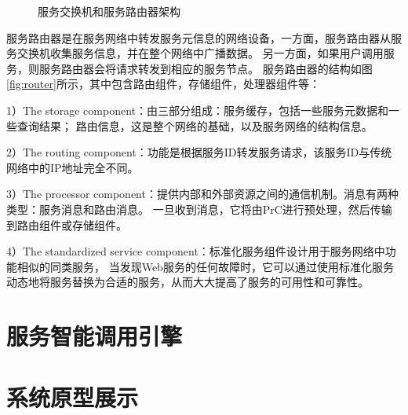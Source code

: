   \begin{figure}[htbp]
    \caption{服务交换机和服务路由器架构}
    \label{fig:loss}
    \end{figure}


    服务路由器是在服务网络中转发服务元信息的网络设备，一方面，服务路由器从服务交换机收集服务信息，并在整个网络中广播数据。 
    另一方面，如果用户调用服务，则服务路由器会将请求转发到相应的服务节点。 
    服务路由器的结构如图\ref{fig:router}所示，其中包含路由组件，存储组件，处理器组件等：

    1）The storage component：由三部分组成：服务缓存，包括一些服务元数据和一些查询结果；
    路由信息，这是整个网络的基础，以及服务网络的结构信息。
    
    2）The routing component：功能是根据服务ID转发服务请求，该服务ID与传统网络中的IP地址完全不同。
    
    3）The processor component：提供内部和外部资源之间的通信机制。消息有两种类型：服务消息和路由消息。
    一旦收到消息，它将由PrC进行预处理，然后传输到路由组件或存储组件。
    
    4）The standardized service component：标准化服务组件设计用于服务网络中功能相似的同类服务，
    当发现Web服务的任何故障时，它可以通过使用标准化服务动态地将服务替换为合适的服务，从而大大提高了服务的可用性和可靠性。


  
  
  \section{服务智能调用引擎}

  \section{系统原型展示}
